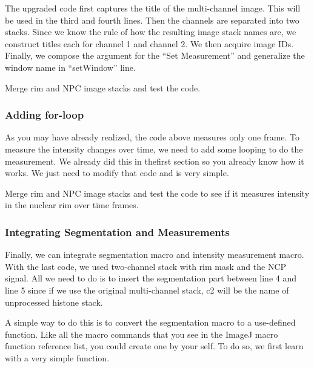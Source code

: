The upgraded code first captures the title of the multi-channel image. This will be used in the third and fourth lines. Then the channels are separated into two stacks. Since we know the rule of how the resulting image stack names are, we construct titles each for channel 1 and channel 2. We then acquire image IDs. Finally,  we compose the argument for the ``Set Measurement'' and generalize the window name in ``setWindow'' line. 

\begin{indentexercise}{1}
Merge rim and NPC image stacks and test the code. 
\end{indentexercise}

\subsubsection{Adding for-loop}

As you may have already realized, the code above measures only one frame. To measure the intensity changes over time, we need to add some looping to do the measurement. We already did this in thefirst section so you already know how it works. We just need to modify that code and is very simple.



\begin{indentexercise}{2}
Merge rim and NPC image stacks and test the code to see if it measures intensity in the nuclear rim over time frames. 
\end{indentexercise}

\subsubsection{Integrating Segmentation and Measurements}

Finally, we can integrate segmentation macro and intensity measurement macro. With the last code, we used  two-channel stack with rim mask and the NCP signal. All we need to do is to insert the segmentation part between line 4 and line 5 since if we use the original multi-channel stack, c2 will be the name of unprocessed histone stack. 

A simple way to do this is to convert the segmentation macro to a use-defined function. Like all the macro commands that you see in the ImageJ macro function reference list, you could create one by your self. To do so, we first learn with a very simple function. 


